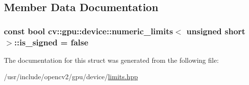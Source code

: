 \subsection{Member Data Documentation}
\hypertarget{structcv_1_1gpu_1_1device_1_1numeric__limits_3_01unsigned_01short_01_4_afca29d1fb561d6836d22658eb028587c}{
\subsubsection[{is\-\_\-signed}]{\setlength{\rightskip}{0pt plus 5cm}const bool {\bf cv\-::gpu\-::device\-::numeric\-\_\-limits}$<$ unsigned short $>$\-::is\-\_\-signed = {\bf false}\hspace{0.3cm}{\ttfamily [static]}}}\label{structcv_1_1gpu_1_1device_1_1numeric__limits_3_01unsigned_01short_01_4_afca29d1fb561d6836d22658eb028587c}


The documentation for this struct was generated from the following file\-:\begin{DoxyCompactItemize}
\item 
/usr/include/opencv2/gpu/device/\hyperlink{limits_8hpp}{limits.\-hpp}\end{DoxyCompactItemize}
